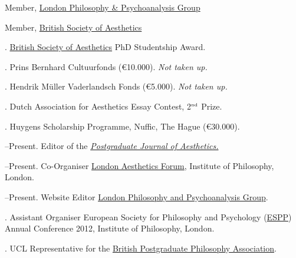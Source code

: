 \documentclass[11pt]{article}
\begin{document}
\bigskip

% 
% 
% 
% 
{}
\ind Member, \href{http://www.philosophy-psychoanalysis.org.uk}{London Philosophy \& Psychoanalysis Group}

\ind Member, \href{http://www.philosophy-psychoanalysis.org.uk}{British Society of Aesthetics}

\bigskip

\medskip

. \href{http://www.british-aesthetics.org}{British Society of Aesthetics} PhD Studentship Award. %

. Prins Bernhard Cultuurfonds (€10.000). \emph{Not taken up.}

. Hendrik Müller Vaderlandsch Fonds (€5.000). \emph{Not taken up.} 

. Dutch Association for Aesthetics Essay Contest, 2$^{\textrm{\tiny{nd}}}$ Prize.

. Huygens Scholarship Programme, Nuffic, The Hague (€30.000).

\bigskip 

\medskip

--Present. Editor of the \href{http:\\www.pjaesthetics.org}{\emph{Postgraduate Journal of Aesthetics.}}

--Present. Co-Organiser \href{http:\\www.londonaestheticsforum.org}{London Aesthetics Forum}, Institute of Philosophy, London.

--Present. Website Editor \href{http://www.philosophy-psychoanalysis.org.uk}{London Philosophy and Psychoanalysis Group}.

. Assistant Organiser European Society for Philosophy and Psychology (\href{http://www.eurospp.org}{ESPP}) Annual Conference 2012, Institute of Philosophy, London. 

. UCL Representative for the \href{http://www.bppa-online.org}{British Postgraduate Philosophy Association}.
\end{document}
